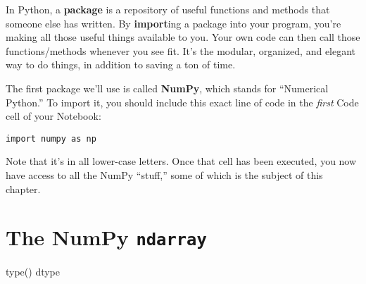 In Python, a \textbf{package} is a repository of useful functions and methods
that someone else has written. By \textbf{import}ing a package into your
program, you're making all those useful things available to you. Your own code
can then call those functions/methods whenever you see fit. It's the modular,
organized, and elegant way to do things, in addition to saving a ton of time.

The first package we'll use is called \textbf{NumPy}, which stands for
``Numerical Python.'' To import it, you should include this exact line of code
in the \textit{first} Code cell of your Notebook:

\begin{Verbatim}[fontsize=\small,samepage=true,frame=single,framesep=3mm]
import numpy as np
\end{Verbatim}

Note that it's in all lower-case letters. Once that cell has been executed, you
now have access to all the NumPy ``stuff,'' some of which is the subject of
this chapter.

\section{The NumPy \texttt{ndarray}}

type()
dtype
